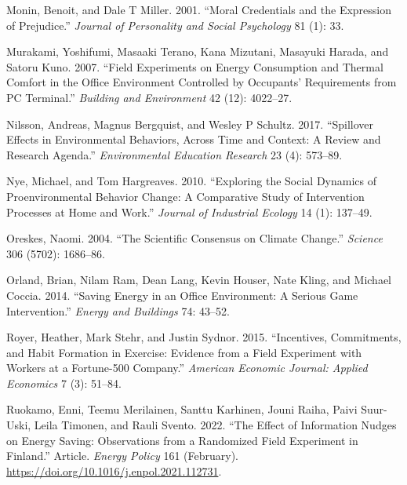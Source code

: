 \documentclass[
  11pt,
]{article}
\newlength{\cslhangindent}
\newlength{\cslentryspacingunit} %
\newenvironment{CSLReferences}[2] %
 {%
  \setlength{\parindent}{0pt}
  \ifodd #1
  \let\oldpar\par
  \def\par{\hangindent=\cslhangindent\oldpar}
  \fi
  \setlength{\parskip}{#2\cslentryspacingunit}
 }%
 {}
\begin{document}
\begin{CSLReferences}{1}{0}
\leavevmode{}%
Monin, Benoit, and Dale T Miller. 2001. {``Moral Credentials and the
Expression of Prejudice.''} \emph{Journal of Personality and Social
Psychology} 81 (1): 33.

\leavevmode{}%
Murakami, Yoshifumi, Masaaki Terano, Kana Mizutani, Masayuki Harada, and
Satoru Kuno. 2007. {``Field Experiments on Energy Consumption and
Thermal Comfort in the Office Environment Controlled by Occupants'
Requirements from PC Terminal.''} \emph{Building and Environment} 42
(12): 4022--27.

\leavevmode{}%
Nilsson, Andreas, Magnus Bergquist, and Wesley P Schultz. 2017.
{``Spillover Effects in Environmental Behaviors, Across Time and
Context: A Review and Research Agenda.''} \emph{Environmental Education
Research} 23 (4): 573--89.

\leavevmode{}%
Nye, Michael, and Tom Hargreaves. 2010. {``Exploring the Social Dynamics
of Proenvironmental Behavior Change: A Comparative Study of Intervention
Processes at Home and Work.''} \emph{Journal of Industrial Ecology} 14
(1): 137--49.

\leavevmode{}%
Oreskes, Naomi. 2004. {``The Scientific Consensus on Climate Change.''}
\emph{Science} 306 (5702): 1686--86.

\leavevmode{}%
Orland, Brian, Nilam Ram, Dean Lang, Kevin Houser, Nate Kling, and
Michael Coccia. 2014. {``Saving Energy in an Office Environment: A
Serious Game Intervention.''} \emph{Energy and Buildings} 74: 43--52.

\leavevmode{}%
Royer, Heather, Mark Stehr, and Justin Sydnor. 2015. {``Incentives,
Commitments, and Habit Formation in Exercise: Evidence from a Field
Experiment with Workers at a Fortune-500 Company.''} \emph{American
Economic Journal: Applied Economics} 7 (3): 51--84.

\leavevmode{}%
Ruokamo, Enni, Teemu Merilainen, Santtu Karhinen, Jouni Raiha, Paivi
Suur-Uski, Leila Timonen, and Rauli Svento. 2022. {``The Effect of
Information Nudges on Energy Saving: Observations from a Randomized
Field Experiment in Finland.''} Article. \emph{Energy Policy} 161
(February). \url{https://doi.org/10.1016/j.enpol.2021.112731}.


\end{CSLReferences}
\end{document}
